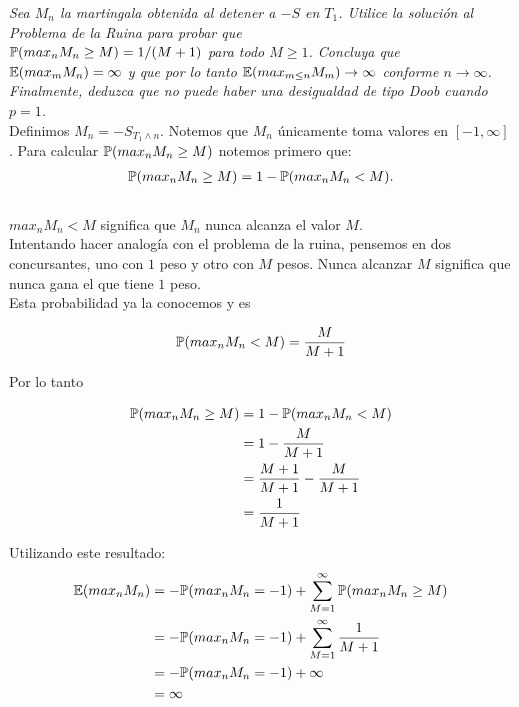 \emph{
	Sea $M_n$ la martingala obtenida al detener a $-S$ en $T_1$. Utilice la solución al
	Problema de la Ruina para probar que \\
	$\mathbb{P}(max_n M_n \geq M) = 1/(M+1)$ para todo $M \geq 1$. Concluya que\\
	$\mathbb{E}(max_m M_n) = \infty$ y que por lo tanto $\mathbb{E}(max_{m\leq n} M_m) \rightarrow \infty$ conforme 
	$n \rightarrow \infty$. Finalmente, deduzca que no puede haber una desigualdad de tipo Doob cuando $p=1$.\\
}	
\afterstatement
	Definimos $M_n = -S_{T_1 \wedge n}$. Notemos que $M_n$ únicamente toma valores en $[-1, \infty]$.
	Para calcular $\mathbb{P}(max_n M_n \geq M)$ notemos primero que:
	\begin{align}
		\mathbb{P}(max_n M_n \geq M) = 1 - \mathbb{P}(max_n M_n < M).
	\end{align}\\
	
	$max_n M_n < M$ significa que $M_n$ nunca alcanza el valor $M$.\\
	 
	Intentando hacer analogía con el problema de la ruina, pensemos en dos concursantes,
	uno con $1$ peso y otro con $M$ pesos. Nunca alcanzar $M$ significa que nunca gana el que tiene $1$ peso.\\
	
	Esta probabilidad ya la conocemos y es 
	
	\begin{align}
		\mathbb{P}(max_n M_n < M) = \frac{M}{M + 1}
	\end{align}
		
	Por lo tanto
	
	\begin{align}
		\mathbb{P}(max_n M_n \geq M) 	&= 1 - \mathbb{P}(max_n M_n < M) \\
								&= 1 - \frac{M}{M + 1}\\
								&= \frac{M+1}{M+1} - \frac{M}{M + 1}\\
								&= \frac{1}{M+1}
	\end{align}
	
	Utilizando este resultado:
	\begin{align} \label{problema1_3:esperanza_del_maximo_de_M_n}
		\mathbb{E}(max_n M_n) 	&= - \mathbb{P}(max_n M_n = -1) + \sum_{M=1}^{\infty} \mathbb{P}(max_n M_n \geq M) \\
						&= - \mathbb{P}(max_n M_n = -1) + \sum_{M=1}^{\infty} \frac{1}{M+1} \\ 
						&= - \mathbb{P}(max_n M_n = -1) + \infty \\
						&= \infty
	\end{align}						
	
